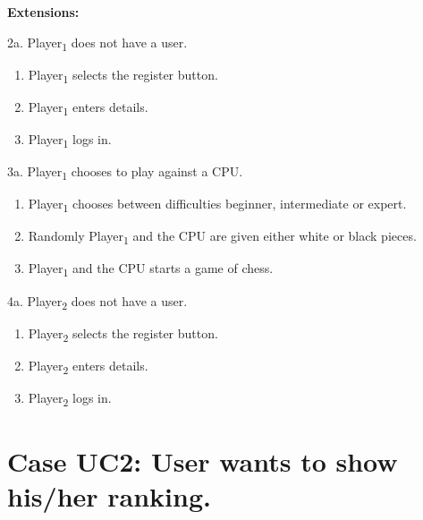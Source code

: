 \documentclass[a4paper,10pt]{article}
\begin{document}
\textbf{Extensions:}
\begin{addmargin}[1.4em]{0em}

2a. \texorpdfstring{Player\textsubscript{1}}{Player 1} does not have a user.
\begin{enumerate}
 \item \texorpdfstring{Player\textsubscript{1}}{Player 1} selects the register button.
 \item \texorpdfstring{Player\textsubscript{1}}{Player 1} enters details.
 \item \texorpdfstring{Player\textsubscript{1}}{Player 1} logs in.
\end{enumerate}
3a. \texorpdfstring{Player\textsubscript{1}}{Player 1} chooses to play against a CPU.
\begin{enumerate}
 \item \texorpdfstring{Player\textsubscript{1}}{Player 1} chooses between difficulties beginner, intermediate or expert.
 \item Randomly \texorpdfstring{Player\textsubscript{1}}{Player 1} and the CPU are given either white or black pieces.
 \item \texorpdfstring{Player\textsubscript{1}}{Player 1} and the CPU starts a game of chess.
\end{enumerate}
4a.  \texorpdfstring{Player\textsubscript{2}}{Player 2} does not have a user.
\begin{enumerate}
 \item \texorpdfstring{Player\textsubscript{2}}{Player 2} selects the register button.
 \item \texorpdfstring{Player\textsubscript{2}}{Player 2} enters details.
 \item \texorpdfstring{Player\textsubscript{2}}{Player 2} logs in.
\end{enumerate}
\end{addmargin}
\section*{Case UC2: User wants to show his/her ranking.}
\end{document}
